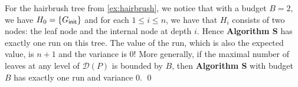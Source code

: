 \begin{tcolorbox}[
    colback=SkyBlue!5,
    colframe=blue!20,
    boxrule=1pt,
    arc=2pt,
    width=\textwidth,
    breakable
]
\begin{example}
For the hairbrush tree from \cref{ex:hairbrush}, we notice that with a budget $B = 2$,
we have $H_0 = {\{ G_{\mathsf{init}} \}}$ and for each $1\leq i \leq n$, we have that $H_i$ consists of two nodes: the leaf node and the internal node at depth $i$.
Hence \textbf{Algorithm S} has exactly one run on this tree.
The value of the run, which is also the expected value, is $n+1$ and the variance is $0$!
More generally, if the maximal number of leaves at any level of $\mathcal{D}(P)$ is bounded by $B$, then \textbf{Algorithm S} with budget $B$
has exactly one run and variance 0.
\qed
\end{example}

\end{tcolorbox}